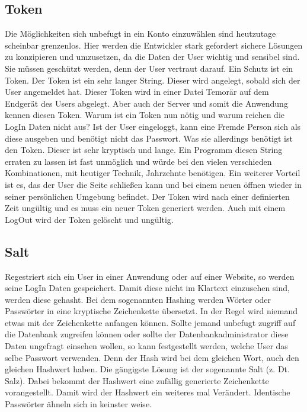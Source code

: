 \subsection{Token}
Die Möglichkeiten sich unbefugt in ein Konto einzuwählen sind heutzutage scheinbar grenzenlos. Hier werden die Entwickler stark gefordert sichere Lösungen zu konzipieren und umzusetzen, da die Daten der User wichtig und sensibel sind. Sie müssen geschützt werden, denn der User vertraut darauf. Ein Schutz ist ein Token. Der Token ist ein sehr langer String. Dieser wird angelegt, sobald sich der User angemeldet hat. Dieser Token wird in einer Datei Temorär auf dem Endgerät des Users abgelegt. Aber auch der Server und somit die Anwendung kennen diesen Token. \autocite{StiftungWarentest.2015} Warum ist ein Token nun nötig und warum reichen die LogIn Daten nicht aus? Ist der User eingeloggt, kann eine Fremde Person sich als diese ausgeben und benötigt nicht das Passwort. Was sie allerdings benötigt ist den Token. Dieser ist sehr kryptisch und lange. Ein Programm diesen String erraten zu lassen ist fast unmöglich und würde bei den vielen verschieden Kombinationen, mit heutiger Technik, Jahrzehnte benötigen. Ein weiterer Vorteil ist es, das der User die Seite schließen kann und bei einem neuen öffnen wieder in seiner persönlichen Umgebung befindet. Der Token wird nach einer definierten Zeit ungültig und es muss ein neuer Token generiert werden. Auch mit einem LogOut wird der Token gelöscht und ungültig.

\subsection{Salt}
Regestriert sich ein User in einer Anwendung oder auf einer Website, so werden seine LogIn Daten gespeichert. Damit diese nicht im Klartext einzusehen sind, werden diese gehasht. Bei dem sogenannten Hashing werden Wörter oder Passwörter in eine kryptische Zeichenkette übersetzt. In der Regel wird niemand etwas mit der Zeichenkette anfangen können. Sollte jemand unbefugt zugriff auf die Datenbank zugreifen können oder sollte der Datenbankadministrator diese Daten ungefragt einsehen wollen, so kann festgestellt werden, welche User das selbe Passwort verwenden. Denn der Hash wird bei dem gleichen Wort, auch den gleichen Hashwert haben. Die gängigste Lösung ist der sogenannte Salt (\ac{z. Dt.} Salz). Dabei bekommt der Hashwert eine zufällig generierte Zeichenkette vorangestellt. Damit wird der Hashwert ein weiteres mal Verändert. \autocite{intersoftconsultingservicesAG.2013} Identische Passwörter ähneln sich in keinster weise.

